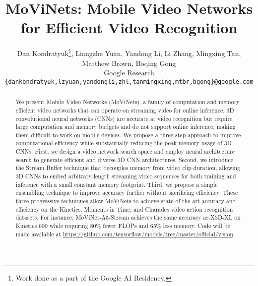 \documentclass[final]{cvpr}
\newcommand{\ournet}{MoViNet\xspace} \newcommand{\ournets}{\ournet{}s\xspace}
\begin{document}
\title{\ournets: Mobile Video Networks for Efficient Video Recognition}

\author{
    Dan Kondratyuk\thanks{Work done as a part of the Google AI Residency.},
    Liangzhe Yuan,
    Yandong Li,
    Li Zhang,
    Mingxing Tan,
    Matthew Brown,
    Boqing Gong\\
    Google Research\\
    {\tt\small \{dankondratyuk,lzyuan,yandongli,zhl,tanmingxing,mtbr,bgong\}@google.com}
}


\maketitle


\begin{abstract}
    We present Mobile Video Networks (\ournets), a family of computation and memory efficient video networks that can operate on streaming video for online inference.
    3D convolutional neural networks (CNNs) are accurate at video recognition but require large computation and memory budgets and do not support online inference, making them difficult to work on mobile devices.
We propose a three-step approach to improve computational efficiency while substantially reducing the peak memory usage of 3D CNNs.
    First, we design a video network search space and employ neural architecture search to generate efficient and diverse 3D CNN architectures.
    Second, we introduce the Stream Buffer technique that decouples memory from video clip duration, allowing 3D CNNs to embed arbitrary-length streaming video sequences for both training and inference with a small constant memory footprint.
    Third, we propose a simple ensembling technique to improve accuracy further without sacrificing efficiency.
    These three progressive techniques allow \ournets to achieve state-of-the-art accuracy and efficiency on the Kinetics, Moments in Time, and Charades video action recognition datasets.
    For instance, \ournet-A5-Stream achieves the same accuracy as X3D-XL on Kinetics 600 while requiring 80\% fewer FLOPs and 65\% less memory.
    Code will be made available at \url{https://github.com/tensorflow/models/tree/master/official/vision}.
\end{abstract}


\vspace{-12pt}
\end{document}
